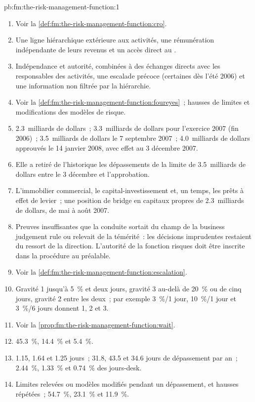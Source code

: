 \begin{solution}{pb:fm:the-risk-management-function:1}
\begin{enumerate}
\item Voir la \cref{def:fm:the-risk-management-function:cro}.
\item Une ligne hiérarchique extérieure aux activités, une rémunération indépendante de leurs revenus et un accès direct au .
\item Indépendance et autorité, combinées à des échanges directs avec les responsables des activités, une escalade précoce (certaines dès l'été 2006) et
une information non filtrée par la hiérarchie.
\item Voir la \cref{def:fm:the-risk-management-function:foureyes}~; hausses de limites et modifications des modèles de risque.
\item 2.3~milliards de dollars~; 3.3~milliards de dollars pour l'exercice 2007 (fin 2006)~; 3.5~milliards de dollars le 7 septembre 2007~; 4.0~milliards de dollars approuvés le 14 janvier 2008,
avec effet au 3 décembre 2007.
\item Elle a retiré de l'historique les dépassements de la limite de 3.5~milliards de dollars entre le 3 décembre et l'approbation.
\item L'immobilier commercial, le capital-investissement et, un temps, les prêts à effet de levier~; une position de bridge en capitaux propres de 2.3~milliards de dollars, de mai à août 2007.
\item Preuves insuffisantes que la conduite sortait du champ de la business judgement rule ou relevait de la témérité~: les décisions imprudentes restaient du ressort de la direction.
L'autorité de la fonction risques doit être inscrite dans la procédure au préalable.
\item Voir la \cref{def:fm:the-risk-management-function:escalation}.
\item Gravité 1 jusqu'à 5~\% et deux jours, gravité 3 au-delà de 20~\% ou de cinq jours, gravité 2 entre les deux~; par exemple 3~\%/1 jour, 10~\%/1 jour et 3~\%/6 jours donnent 1, 2 et 3.
\item Voir la \cref{prop:fm:the-risk-management-function:wait}.
\item 45.3~\%, 14.4~\% et 5.4~\%.
\item 1.15, 1.64 et 1.25 jours~; 31.8, 43.5 et 34.6 jours de dépassement par an~; 2.44~\%, 1.33~\% et 0.74~\% des jours-desk.
\item Limites relevées ou modèles modifiés pendant un dépassement, et hausses répétées~; 54.7~\%, 23.1~\% et 11.9~\%.

\end{enumerate}
\end{solution}
